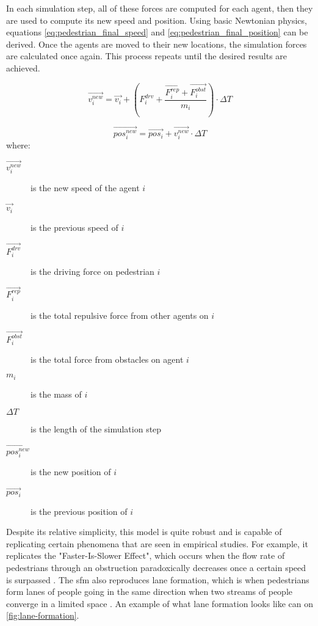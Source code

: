 \documentclass[twoside, 11pt]{article}
\begin{document}
In each simulation step, all of these forces are computed for each agent, then they are used to compute its new speed and position. Using basic Newtonian physics, equations \eqref{eq:pedestrian_final_speed} and \eqref{eq:pedestrian_final_position} can be derived. Once the agents are moved to their new locations, the simulation forces are calculated once again. This process repeats until the desired results are achieved.

\begin{equation}
  \vec{v_i^{new}} = \vec{v_i} + ( F_i^{drv} + \frac{\vec{F_i^{rep}} + \vec{F_i^{obst}}}{m_i} ) \cdot \Delta T
  \label{eq:pedestrian_final_speed}
\end{equation}

\begin{equation}
  \vec{pos_i^{new}} = \vec{pos_i} + \vec{v_i^{new}} \cdot \Delta T
  \label{eq:pedestrian_final_position}
\end{equation}
where:
\begin{description}
  \item[$\vec{v_i^{new}}$] is the new speed of the agent $i$
  \item[$\vec{v_i}$] is the previous speed of $i$
  \item[$\vec{F_i^{drv}}$] is the driving force on pedestrian $i$
  \item[$\vec{F_i^{rep}}$] is the total repulsive force from other agents on $i$
  \item[$\vec{F_i^{obst}}$] is the total force from obstacles on agent $i$
  \item[$m_i$] is the mass of $i$ 
  \item[$\Delta T$] is the length of the simulation step
  \item[$\vec{pos_i^{new}}$] is the new position of $i$
  \item[$\vec{pos_i}$] is the previous position of $i$
\end{description}

Despite its relative simplicity, this model is quite robust and is capable of replicating certain phenomena that are seen in empirical studies. For example, it replicates the "Faster-Is-Slower Effect", which occurs when the flow rate of pedestrians through an obstruction paradoxically decreases once a certain speed is surpassed \cite{helbingSimulatingDynamicFeatures2000}. The \gls{sfm} also reproduces lane formation, which is when pedestrians form lanes of people going in the same direction when two streams of people converge in a limited space \cite{PhysRevE.94.032304}. An example of what lane formation looks like can on \autoref{fig:lane-formation}.
\end{document}
